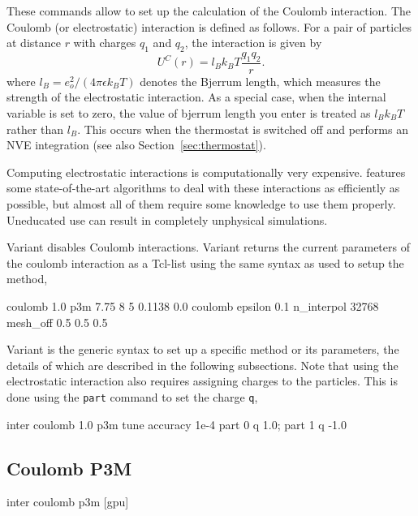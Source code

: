 These commands allow to set up the calculation of the Coulomb
interaction.  The Coulomb (or electrostatic) interaction is defined as
follows.  For a pair of particles at distance $r$ with charges $q_1$
and $q_2$, the interaction is given by
\begin{equation}
  U^C(r)=l_B k_B T\frac{q_1 q_2}{r}.
\end{equation}
where $l_B = e_o^2 / (4 \pi \epsilon k_B T)$ denotes the Bjerrum
length, which measures the strength of the electrostatic interaction.
As a special case, when the internal variable  
is set to zero, the value of bjerrum length you enter 
is treated as $l_B k_B T$ rather than $l_B$. This occurs when the
thermostat is switched off and \es performs an NVE integration
(see also Section~\ref{sec:thermostat}).

Computing electrostatic interactions is computationally very
expensive.  \es{} features some state-of-the-art algorithms to deal
with these interactions as efficiently as possible, but almost all of
them require some knowledge to use them properly.  Uneducated use can
result in completely unphysical simulations.

Variant  disables Coulomb interactions.  Variant
 returns the current parameters of the coulomb interaction
as a Tcl-list using the same syntax as used to setup the method, \eg
\begin{tclcode}
  {coulomb 1.0 p3m 7.75 8 5 0.1138 0.0}
  {coulomb epsilon 0.1 n_interpol 32768 mesh_off 0.5 0.5 0.5}
\end{tclcode}

Variant  is the generic syntax to set up a specific method
or its parameters, the details of which are described in the following
subsections.  Note that using the electrostatic interaction also
requires assigning charges to the particles.  This is done using the
\texttt{part} command to set the charge \texttt{q}, \eg
\begin{tclcode}
  inter coulomb 1.0 p3m tune accuracy 1e-4
  part 0 q 1.0; part 1 q -1.0
\end{tclcode}

\subsection{Coulomb P3M}
\label{sec:coulomb}

\begin{essyntax}
  inter coulomb  p3m [gpu] 
     
  \begin{features}
  \end{features}
\end{essyntax}

